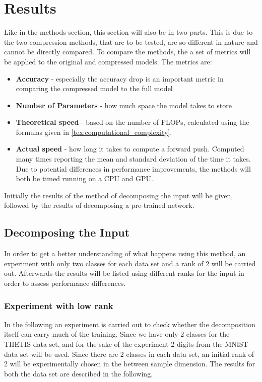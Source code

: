 \section{Results}
Like in the methods section, this section will also be in two parts. This is due to the two compression methods, that are to be tested, are so different in nature and cannot be directly compared. To compare the methods, the a set of metrics will be applied to the original and compressed models. The metrics are:
\begin{itemize}
    \item \textbf{Accuracy} - especially the accuracy drop is an important metric in comparing the compressed model to the full model
    \item \textbf{Number of Parameters} - how much space the model takes to store
    \item \textbf{Theoretical speed} - based on the number of FLOPs, calculated using the formulas given in \autoref{tex:computational_complexity}.
    \item \textbf{Actual speed} - how long it takes to compute a forward push. Computed many times reporting the mean and standard deviation of the time it takes. Due to potential differences in performance improvements, the methods will both be timed running on a CPU and GPU.
\end{itemize}
Initially the results of the method of decomposing the input will be given, followed by the results of decomposing a pre-trained network.

\subsection{Decomposing the Input}
In order to get a better understanding of what happens using this method, an experiment with only two classes for each data set and a rank of 2 will be carried out. Afterwards the results will be listed using different ranks for the input in order to assess performance differences.

\subsubsection{Experiment with low rank}
In the following an experiment is carried out to check whether the decomposition itself can carry much of the training. Since we have only 2 classes for the THETIS data set, and for the sake of the experiment 2 digits from the MNIST data set will be used. Since there are 2 classes in each data set, an initial rank of 2 will be experimentally chosen in the between sample dimension. The results for both the data set are described in the following.

